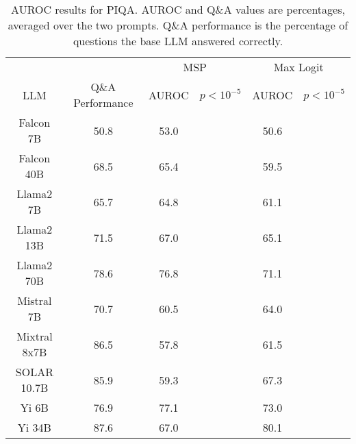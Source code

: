 \begin{table*}
\centering
\begin{tabular}{c|c|c|c|c|c}
& & \multicolumn{2}{c|}{MSP} & \multicolumn{2}{c}{Max Logit} \\ 
LLM & Q\&A Performance & AUROC & $p < 10^{-5}$ & AUROC & $p < 10^{-5}$\\ \hline
Falcon 7B & 50.8 & 53.0 &  & 50.6 & \\
Falcon 40B & 68.5 & 65.4 &  & 59.5 & \\
Llama2 7B & 65.7 & 64.8 &  & 61.1 & \\
Llama2 13B & 71.5 & 67.0 &  & 65.1 & \\
Llama2 70B & 78.6 & 76.8 &  & 71.1 & \\
Mistral 7B & 70.7 & 60.5 &  & 64.0 & \\
Mixtral 8x7B & 86.5 & 57.8 &  & 61.5 & \\
SOLAR 10.7B & 85.9 & 59.3 &  & 67.3 & \\
Yi 6B & 76.9 & 77.1 &  & 73.0 & \\
Yi 34B & 87.6 & 67.0 &  & 80.1 & \\
\hline
\end{tabular}
\caption{AUROC results for PIQA. AUROC and Q\&A values are percentages, averaged over the two prompts. Q\&A performance is the percentage of questions the base LLM answered correctly.}
\label{tab:piqa_auroc}
\end{table*}
